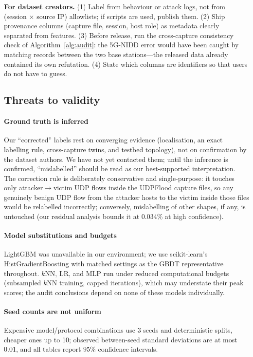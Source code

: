 \documentclass[preprint,12pt]{elsarticle}
\begin{document}
\textbf{For dataset creators.} (1) Label from behaviour or attack logs, not
from (session $\times$ source IP) allowlists; if scripts are used, publish
them. (2) Ship provenance columns (capture file, session, host role) as
metadata clearly separated from features. (3) Before release, run the
cross-capture consistency check of Algorithm~\ref{alg:audit}: the 5G-NIDD
error would have been caught by matching records between the two base
stations---the released data already contained its own refutation. (4) State
which columns are identifiers so that users do not have to guess.

\subsection{Threats to validity}
\label{sec:threats}

\paragraph{Ground truth is inferred} Our ``corrected'' labels rest on
converging evidence (localisation, an exact labelling rule, cross-capture
twins, and testbed topology), not on confirmation by the dataset authors. We
have not yet contacted them; until the inference is confirmed, ``mislabelled''
should be read as our best-supported interpretation. The correction rule is
deliberately conservative and single-purpose: it touches only
attacker$\to$victim UDP flows inside the UDPFlood capture files, so any
genuinely benign UDP flow from the attacker hosts to the victim inside those
files would be relabelled incorrectly; conversely, mislabelling of other
shapes, if any, is untouched (our residual analysis bounds it at 0.034\% at
high confidence).

\paragraph{Model substitutions and budgets} LightGBM was unavailable in our
environment; we use scikit-learn's HistGradientBoosting with matched settings
as the GBDT representative throughout. $k$NN, LR, and MLP run under reduced
computational budgets (subsampled $k$NN training, capped iterations), which
may understate their peak scores; the audit conclusions depend on none of
these models individually.

\paragraph{Seed counts are not uniform} Expensive model/protocol combinations
use 3 seeds and deterministic splits, cheaper ones up to 10; observed
between-seed standard deviations are at most 0.01, and all tables report 95\%
confidence intervals.
\end{document}
